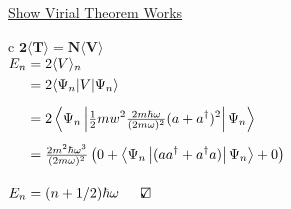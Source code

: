 \documentclass[12pt]{article}
\newcommand{\checkedbox}{\mbox{\ooalign{$\checkmark$\cr\hidewidth$\square$\hidewidth\cr}}} %
\begin{document}
\hfill \break
\begin{minipage}[t]{.48\textwidth}
    \setlength{\parindent}{.5cm}
    \noindent \underline{Show Virial Theorem Works}\\[15pt]
    { \setlength{\tabcolsep}{0pt}
    \begin{tabular}{c}
        \( \boldsymbol{ 2 \langle T \rangle = N \langle V \rangle } \) \\[20pt]
        \( \begin{aligned} 
            E_n &= 2 \langle V \rangle_n\\
            &= 2 \langle \Psi_n |V| \Psi_n \rangle\\[5pt]
            &= 2 \left\langle \Psi_n \left| \tfrac{1}{2}mw^2 
                \tfrac{2m \hbar \omega}{(2m \omega)^2} 
                (a + a^\dagger)^2 \right| \Psi_n \right\rangle \\[5pt]
            &= \tfrac{2m^2 \hbar \omega^3}{(2m \omega)^2} 
                \left( 0 + \left\langle \Psi_n \left| (a a^\dagger + a^\dagger a) \right| 
                \Psi_n \right\rangle + 0 \right)\\[10pt]
            E_n &= (n+1/2) \hbar \omega \indent \checkedbox
        \end{aligned} \)
    \end{tabular} }
\end{minipage}
\end{document}

